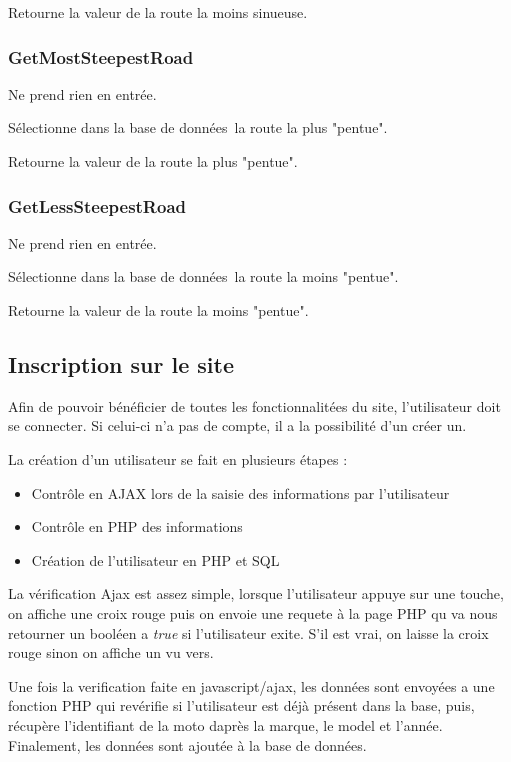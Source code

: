 \documentclass[a4paper]{article}
\newcommand{\bdd}{base de données}
\newcommand{\diag}[1]{}
\begin{document}
Retourne la valeur de la route la moins sinueuse.

\subsubsection{GetMostSteepestRoad}
Ne prend rien en entrée.

Sélectionne dans la \bdd \  la route la plus "pentue".

Retourne la valeur de la route la plus "pentue".

\subsubsection{GetLessSteepestRoad}
Ne prend rien en entrée.

Sélectionne dans la \bdd \  la route la moins "pentue".

Retourne la valeur de la route la moins "pentue".

\newpage
\subsection{Inscription sur le site}

Afin de pouvoir bénéficier de toutes les fonctionnalitées du site, l'utilisateur doit se connecter. Si celui-ci n'a pas de compte, il a la possibilité d'un créer un. 

La création d'un utilisateur se fait en plusieurs étapes :
\begin{itemize}
    \item Contrôle en AJAX lors de la saisie des informations par l'utilisateur
    \item Contrôle en PHP des informations
    \item Création de l'utilisateur en PHP et SQL
\end{itemize}

La vérification Ajax est assez simple, lorsque l'utilisateur appuye sur une touche, on affiche une croix rouge puis on envoie une requete à la page PHP qu va nous retourner un booléen a \emph{true} si l'utilisateur exite. S'il est vrai, on laisse la croix rouge sinon on affiche un vu vers.

Une fois la verification faite en javascript/ajax, les données sont envoyées a une fonction PHP qui revérifie si l'utilisateur est déjà présent dans la base, puis, récupère l'identifiant de la moto daprès la marque, le model et l'année.
Finalement, les données sont ajoutée à la base de données.
\begin{center}
	 \diag{Inscription}
\end{center}
\end{document}
